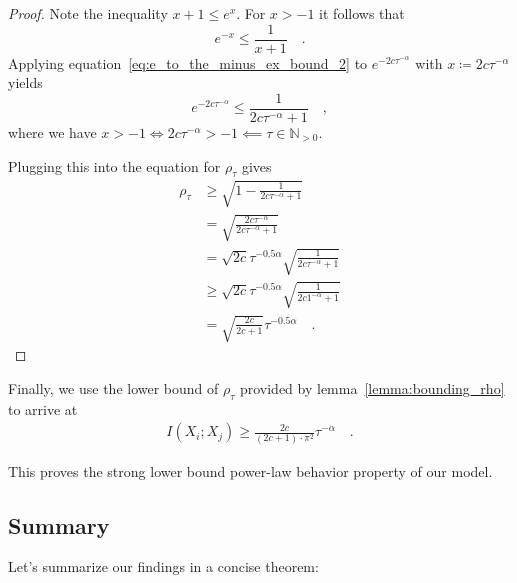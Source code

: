 \documentclass[../../main.tex]{subfiles}
\begin{document}
\begin{proof}
    Note the inequality $x + 1 \leq e^x$. For $x > -1$ it follows that
    \begin{equation}
        e^{-x} \leq \frac{1}{x + 1} \label{eq:e_to_the_minus_ex_bound_2} \quad .
    \end{equation}
    Applying equation~\ref{eq:e_to_the_minus_ex_bound_2} to $e^{-2c \tau^{-\alpha}}$ with $x \coloneqq 2c \tau^{-\alpha}$ yields
    \[
        e^{-2c \tau^{-\alpha}} \leq \frac{1}{2c \tau^{-\alpha} + 1} \quad ,
    \]
    where we have $x > -1 \iff 2c \tau^{-\alpha} > -1 \impliedby \tau \in \mathbb{N}_{>0}$.

    Plugging this into the equation for $\rho_\tau$ gives
    \begin{align*}
        \rho_\tau &\geq \sqrt{1 - \frac{1}{2c \tau^{-\alpha} + 1}} \\
        &= \sqrt{\frac{2c \tau^{-\alpha}}{2c \tau^{-\alpha} + 1}} \\
        &= \sqrt{2c} \tau^{-0.5\alpha} \sqrt{\frac{1}{2c \tau^{-\alpha} + 1}} \\
        &\geq \sqrt{2c} \tau^{-0.5\alpha} \sqrt{\frac{1}{2c 1^{-\alpha} + 1}} \\
        &= \sqrt{\frac{2c}{2c + 1}} \tau^{-0.5 \alpha} \quad .
    \end{align*}
\end{proof}

Finally, we use the lower bound of $\rho_\tau$ provided by lemma~\ref{lemma:bounding_rho} to arrive at
\begin{align*}
    I(X_i; X_j) \geq \frac{2c}{(2c + 1) \cdot \pi^2} \tau^{-\alpha} \quad .
\end{align*}

This proves the strong lower bound power-law behavior property of our model.

\pagebreak
\subsection{Summary}
Let's summarize our findings in a concise theorem:
\end{document}
